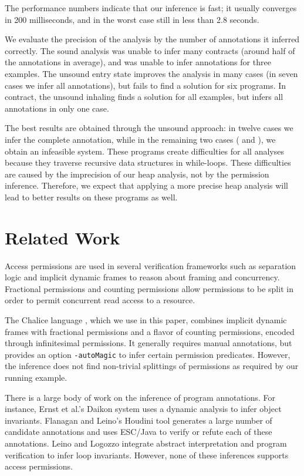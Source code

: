 \documentclass{llncs}
\begin{document}
The performance numbers indicate that our inference is fast; it
usually converges in 200 milliseconds, and in the worst case still in
less than 2.8 seconds. 

We evaluate the precision of the analysis by the number of annotations
it inferred correctly. The sound analysis was unable to infer many
contracts (around half of the annotations in average), and was unable
to infer annotations for three examples.  The unsound entry state
improves the analysis in many cases (in seven cases we infer all
annotations), but fails to find a solution for six programs. In
contract, the unsound inhaling finds a solution for all examples, but
infers all annotations in only one case.

The best results are obtained through the unsound approach: in twelve
cases we infer the complete annotation, while in the remaining two
cases ( and ), we
obtain an infeasible system.  These programs create difficulties for
all analyses because they traverse recursive data structures in
while-loops. These difficulties are caused by the imprecision of our
heap analysis, not by the permission inference. Therefore, we expect
that applying a more precise heap analysis will lead to better
results on these programs as well.

\goup
\section{Related Work}
\goup
\label{sect:relatedwork}

Access permissions are used in several verification frameworks such as
separation logic \cite{REY02} and implicit dynamic frames \cite{SJP09}
to reason about framing and concurrency. Fractional permissions
\cite{Boyland03} and counting permissions \cite{BornatCOP05} allow
permissions to be split in order to permit concurrent read access to a
resource.

The Chalice language \cite{LM09}, which we use in this paper, combines
implicit dynamic frames with fractional permissions and a flavor of
counting permissions, encoded through infinitesimal permissions. It
generally requires manual annotations, but provides an option
\texttt{-autoMagic} to infer certain permission predicates. However,
the inference does not find non-trivial splittings of permissions as
required by our running example.

There is a large body of work on the inference of program
annotations. For instance, Ernst et al.'s Daikon system \cite{EPG07}
uses a dynamic analysis to infer object invariants. Flanagan and
Leino's Houdini tool \cite{FL01} generates a large number of candidate
annotations and uses ESC/Java to verify or refute each of these
annotations. Leino and Logozzo \cite{LL05} integrate abstract
interpretation and program verification to infer loop
invariants. However, none of these inferences supports access
permissions.
\end{document}
